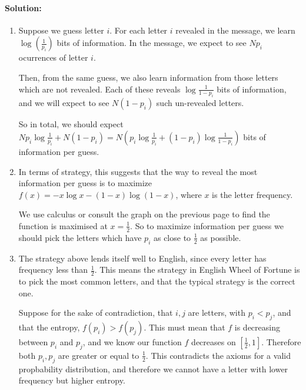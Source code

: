 \documentclass{article}
\begin{document}
\paragraph{Solution: }
\begin{enumerate}
    \item Suppose we guess letter $i$. For each letter $i$ revealed in the message, we learn $\log\left(   \frac{1}{p_i}\right)$ bits of information. In the message, we expect to see $Np_i$ ocurrences of letter $i$. 

        Then, from the same guess, we also learn information from those letters which are not revealed. Each of these reveals $\log \frac{1}{1-p_i}$ bits of information, and we will expect to see $N(1-p_i)$ such un-revealed letters.

    So in total, we should expect $Np_i\log \frac{1}{p_i}+ N(1-p_i)=N\left( p_i\log \frac{1}{p_i}+ (1-p_i) \log \frac{1}{1-p_i}\right) $ bits of information per guess.
    \item In terms of strategy, this suggests that the way to reveal the most information per guess is to maximize $f(x)=-x\log x - (1-x)\log (1-x)$, where $x$ is the letter frequency.


We use calculus or consult the graph on the previous page to find the function is maximised at $x=\frac{1}{2}$. So to maximize information per guess we should pick the letters which have $p_i$ as close to $\frac{1}{2}$ as possible.


\item The strategy above lends itself well to English, since every letter has frequency less than $\frac{1}{2}$. This means the strategy in English Wheel of Fortune is to pick the most common letters, and that the typical strategy is the correct one.

    Suppose for the sake of contradiction, that $i,j$ are letters, with $p_i<p_j$, and that the entropy, $f(p_i)>f(p_j)$. This must mean that $f$ is decreasing between $p_i$ and $p_j$, and we know our function $f$ decreases on $[\frac{1}{2},1]$. Therefore both $p_i,p_j$ are greater or equal to $\frac{1}{2}.$ This contradicts the axioms for a valid propbability distribution, and therefore we cannot have a letter with lower frequency but higher entropy.

\end{enumerate}
\end{document}
